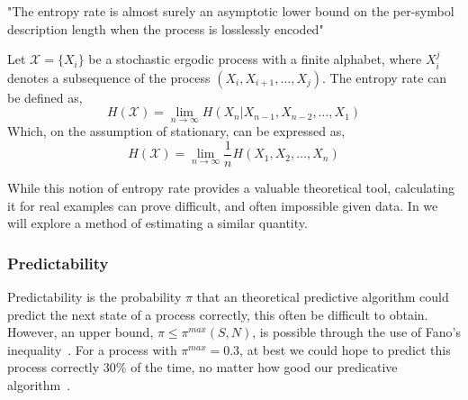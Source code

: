"The entropy rate is almost surely an asymptotic lower bound on the per-symbol description length when the process is losslessly encoded" 

\begin{definition}\label{def:entropyrate}
	Let  $\mathcal{X}= \{ X_i \}$ be a stochastic ergodic process with a finite alphabet, where $X_i^j$ denotes a subsequence of the process $(X_{i}, X_{i+1}, \ldots, X_{j})$.
	The entropy rate can be defined as,
	\begin{equation}\label{eq:entropyrate}
	H(\mathcal{X})=\lim _{n \rightarrow \infty} H\left(X_{n} | X_{n-1}, X_{n-2}, \ldots, X_{1}\right)
	\end{equation}
	Which, on the assumption of stationary, can be expressed as,
	\begin{equation}
	H(\mathcal{X})=\lim _{n \rightarrow \infty} \frac{1}{n} H\left(X_{1}, X_{2}, \ldots, X_{n}\right)
	\end{equation}
\end{definition}

While this notion of entropy rate provides a valuable theoretical tool, calculating it for real examples can prove difficult, and often impossible given data. In  we will explore a method of estimating a similar quantity.




\subsubsection{Predictability}

Predictability is the probability $\pi$ that an theoretical predictive algorithm could predict the next state of a process correctly, this often be difficult to obtain. However, an upper bound, $\pi \leq \pi^{max}(S,N)$, is possible through the use of Fano's inequality~\cite{fano_transmission_1961}. For a process with $\pi^{max} = 0.3$, at best we could hope to predict this process correctly 30\% of the time, no matter how good our predicative algorithm~\cite{song_limits_2010}.


